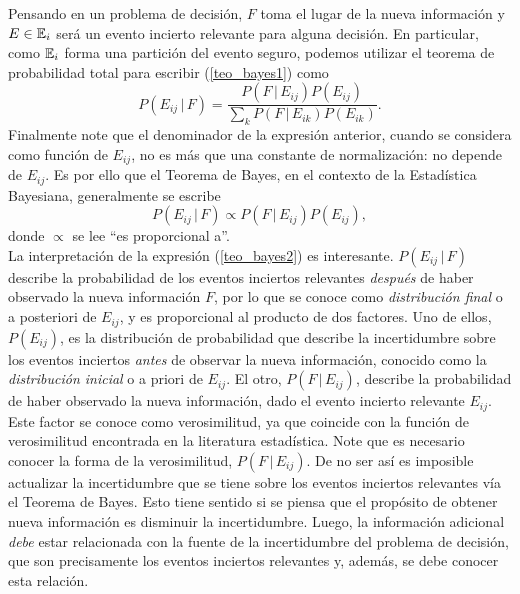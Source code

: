 Pensando en un problema de decisión, $F$ toma el lugar de la nueva información y $E \in \mathbb{E}_i$ será un evento incierto relevante para alguna decisión. En particular, como $\mathbb{E}_i$ forma una partición del evento seguro, podemos utilizar el teorema de probabilidad total para escribir (\ref{teo_bayes1}) como
\begin{equation*}
P(E_{ij} \, | \, F) = \frac{P(F \, | \, E_{ij}) P(E_{ij})}{ \sum_{k} P(F \, | \, E_{ik}) P(E_{ik}) }.
\end{equation*}
Finalmente note que el denominador de la expresión anterior, cuando se considera como función de $E_{ij}$, no es más que una constante de normalización: no depende de $E_{ij}$. Es por ello que el Teorema de Bayes, en el contexto de la Estadística Bayesiana, generalmente se escribe
\begin{equation}\label{teo_bayes2}
P(E_{ij} \, | \, F) \propto P(F \, | \, E_{ij}) P(E_{ij}),
\end{equation}
donde $\propto$ se lee ``es proporcional a''. \\

La interpretación de la expresión (\ref{teo_bayes2}) es interesante. $P(E_{ij} \, | \, F)$ describe la probabilidad de los eventos inciertos relevantes \textit{después} de haber observado la nueva información $F$, por lo que se conoce como \textit{distribución final} o a posteriori de $E_{ij}$, y es proporcional al producto de dos factores. Uno de ellos, $P(E_{ij})$, es la distribución de probabilidad que describe la incertidumbre sobre los eventos inciertos \textit{antes} de observar la nueva información, conocido como la \textit{distribución inicial} o a priori de $E_{ij}$. El otro, $P(F \, | \, E_{ij})$, describe la probabilidad de haber observado la nueva información, dado el evento incierto relevante $E_{ij}$. Este factor se conoce como verosimilitud, ya que coincide con la función de verosimilitud encontrada en la literatura estadística. Note que es necesario conocer la forma de la verosimilitud, $P(F \, | \, E_{ij})$. De no ser así es imposible actualizar la incertidumbre que se tiene sobre los eventos inciertos relevantes vía el Teorema de Bayes. Esto tiene sentido si se piensa que el propósito de obtener nueva información es disminuir la incertidumbre. Luego, la información adicional \textit{debe} estar relacionada con la fuente de la incertidumbre del problema de decisión, que son precisamente los eventos inciertos relevantes y, además, se debe conocer esta relación. \\

